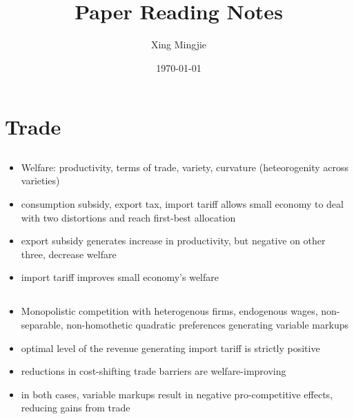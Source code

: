\documentclass[10pt]{article} %
\title{Paper Reading Notes}
\author{Xing Mingjie}
\date{\today} %
\begin{document}
\maketitle

\tableofcontents

\newpage

\section{Trade}
    \subsection{\cite{AkcigitAtesImpullitti2018}}
    
	\subsection{\cite{Fernandesetal2023}}
    
    \subsection{\cite{MartinMejeanParenti2023}}

    \subsection{\cite{DemidovaRodriguezClare2009}}
    \begin{itemize}
        \item Welfare: productivity, terms of trade, variety, curvature (heteorogenity across varieties)
        \item consumption subsidy, export tax, import tariff allows small economy to deal with two distortions and reach first-best allocation
        \item export subsidy generates increase in productivity, but negative on other three, decrease welfare
        \item import tariff improves small economy's welfare
    \end{itemize}

    \subsection{\cite{Demidova2017}}
    \begin{itemize}
        \item Monopolistic competition with heterogenous firms, endogenous wages, non-separable, non-homothetic quadratic preferences generating variable markups
        \item optimal level of the revenue generating import tariff is strictly positive
        \item reductions in cost-shifting trade barriers are welfare-improving
        \item in both cases, variable markups result in negative pro-competitive effects, reducing gains from trade
    \end{itemize}
\end{document}
